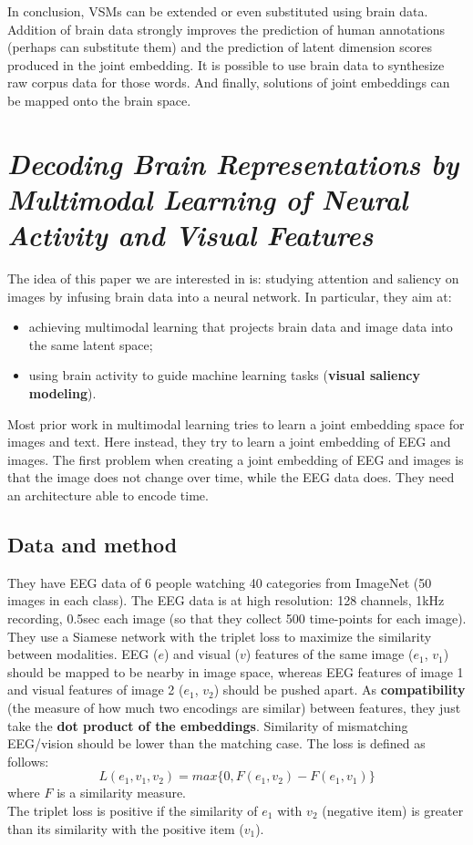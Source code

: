 In conclusion, VSMs can be extended or even substituted using brain data. Addition of brain data strongly improves the prediction of human annotations (perhaps can substitute them) and the prediction of latent dimension scores produced in the joint embedding. It is possible to use brain data to synthesize raw corpus data for those words. And finally, solutions of joint embeddings can be mapped onto the brain space.


\section[Decoding brain representations by multimodal learning of neural activity and visual features]{\textit{Decoding Brain Representations by Multimodal Learning of Neural Activity and Visual Features}\\ }

The idea of this paper we are interested in is: studying attention and saliency on images by infusing brain data into a neural network. In particular, they aim at:
\begin{itemize}
    \item achieving multimodal learning that projects brain data and image data into the same latent space;
    \item using brain activity to guide machine learning tasks (\textbf{visual saliency modeling}).
\end{itemize}

Most prior work in multimodal learning tries to learn a joint embedding space for images and text. Here instead, they try to learn a joint embedding of EEG and images.
The first problem when creating a joint embedding of EEG and images is that the image does not change over time, while the EEG data does. They need an architecture able to encode time.

\subsection{Data and method}
They have EEG data of 6 people watching 40 categories from ImageNet (50 images in each class). The EEG data is at high resolution: 128 channels, 1kHz recording, 0.5sec each image (so that they collect 500 time-points for each image).\\

They use a Siamese network with the triplet loss to maximize the similarity between modalities. EEG ($e$) and visual ($v$) features of the same image ($e_1$, $v_1$) should be mapped to be nearby in image space, whereas EEG features of image 1 and visual features of image 2 ($e_1$, $v_2$) should be pushed apart.
As \textbf{compatibility} (the measure of how much two encodings are similar) between features, they just take the \textbf{dot product of the embeddings}.
Similarity of mismatching EEG/vision should be lower than the matching case.
The loss is defined as follows:
\[
L(e_1, v_1, v_2) = max\{0, F(e_1, v_2) - F(e_1, v_1)\}
\]
where $F$ is a similarity measure.\\
The triplet loss is positive if the similarity of $e_1$ with $v_2$ (negative item) is greater than its similarity with the positive item ($v_1$).\\


